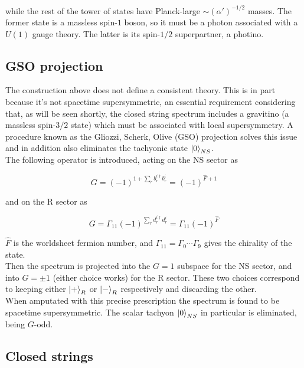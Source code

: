 while the rest of the tower of states have Planck-large $\sim (\alpha')^{-1/2}$ masses. The former state is a massless spin-$1$ boson, so it must be a photon associated with a $U(1)$ gauge theory. The latter is its spin-$1/2$ superpartner, a photino.

\subsection{GSO projection}

The construction above does not define a consistent theory. This is in part because it's not spacetime supersymmetric, an essential requirement considering that, as will be seen shortly, the closed string spectrum includes a gravitino (a massless spin-$3/2$ state) which must be associated with local supersymmetry. A procedure known as the Gliozzi, Scherk, Olive (GSO) projection solves this issue and in addition also eliminates the tachyonic state $\ket{0}_{NS}$.\\

The following operator is introduced, acting on the NS sector as

\begin{equation}
	G = (-1)^{1+\sum_r b_r^{i\dagger} b_r^i} = (-1)^{\hat F + 1}
	\label{}
\end{equation}

and on the R sector as

\begin{equation}
	G = \Gamma_{11}(-1)^{\sum_r d_r^{i\dagger} d_r^i} = \Gamma_{11} (-1)^{\hat F}
	\label{}
\end{equation}

$\hat F$ is the worldsheet fermion number, and $\Gamma_{11} = \Gamma_0 \cdots\Gamma_9$ gives the chirality of the state.\\

Then the spectrum is projected into the $G=1$ subspace for the NS sector, and into $G=\pm1$ (either choice works) for the R sector. These two choices correspond to keeping either $\ket{+}_R$ or $\ket{-}_R$ respectively and discarding the other.\\

When amputated with this precise prescription the spectrum is found to be spacetime supersymmetric. The scalar tachyon $\ket{0}_{NS}$ in particular is eliminated, being $G$-odd.


\subsection{Closed strings}

